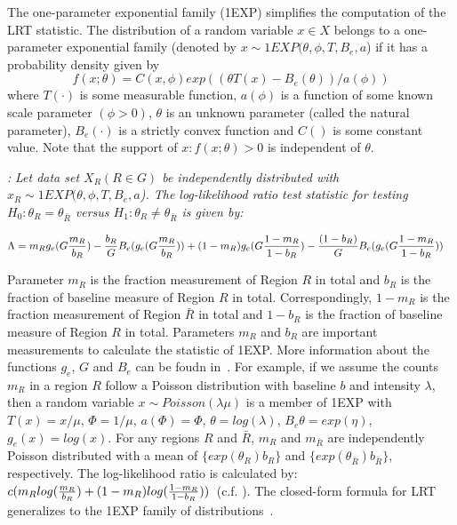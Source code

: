 \documentclass[AMA,LATO1COL]{WileyNJD-v2}
\begin{document}
The one-parameter exponential family (1EXP) simplifies the computation of the LRT statistic. The distribution of a random variable $x\in X$ belongs to a one-parameter exponential family \cite{DagMaxmize} (denoted by $x\sim 1EXP(\theta,\phi,T,B_e,a$) if it has a probability density given by
\begin{equation}
f(x; \theta )=C(x,\phi)exp((\theta T(x)-B_e(\theta))/a(\phi))
\label{oneexp}
\end{equation}
where  $T(\cdot)$ is some measurable function, $a(\phi)$ is a function of some known scale parameter $(\phi>0)$, $\theta$ is an unknown parameter (called the natural parameter), $B_e(\cdot)$ is a strictly convex function and $C()$ is some constant value. Note that the support of ${x:f(x;\theta)>0}$ is independent of $\theta$.
\begin{theorem}\label{thm1}
{\it\cite{DagMaxmize}:}
{\it Let data set $X_R (R\in G)$ be independently distributed with $x_R\sim 1EXP(\theta,\phi,T,B_e,a$). The log-likelihood ratio test statistic for testing $H_{0}: \theta_R = \theta_{\bar R}$ versus $H_{1}: \theta_R \neq \theta_{\bar R}$ is given by:}

\begin{eqnarray}
\Lambda&={m_R}g_e({G{m_R\over b_R}})-{b_R\over G} {B_e(g_e(G{m_R\over b_R}))} +(1-m_R)g_e({G{1-m_R\over {1-b_R}}})-{(1-b_R)\over G}{B_e(g_e({G{1-m_R\over {1-b_R}}}))}
\label{eq}
\end{eqnarray}
\label{thm1}
\end{theorem}
Parameter $m_R$ is the fraction measurement of Region $R$ in total and $b_R$ is the fraction of baseline measure of Region $R$ in total. Correspondingly, $1-m_R$ is the fraction measurement of Region $\bar R$ in total and $1-b_R$ is the fraction of baseline measure of Region $R$ in total. Parameters $m_R$  and $b_R$ are important measurements to calculate the statistic of 1EXP. More information about the functions $g_e$, $G$ and $B_e$ can be foudn in~\cite{DagMaxmize}.
For example, if we assume the counts $m_R$ in a region $R$ follow a Poisson distribution with baseline $b$ and intensity $\lambda$, then a random variable $x \sim Poisson(\lambda \mu)$ is a member of 1EXP with $T(x)=x/\mu$, $\Phi=1/\mu$, $a(\Phi)=\Phi$, $\theta=log(\lambda)$, $B_e{\theta}=exp(\eta)$, $g_e{(x)}=log(x)$. For any regions $R$ and $\bar R$, $m_R$ and $m_{\bar R}$ are independently Poisson distributed with a mean of $\{exp(\theta_R)b_R\}$ and $\{exp(\theta_{\bar R})b_{\bar R}\}$, respectively. The log-likelihood ratio is calculated by: $c(m_R log ({m_R\over {b_R}})+ (1-m_R)log({{1-m_R}\over {1-b_R} }))$~(c.f. \cite{DagMaxmize}). The closed-form formula for LRT generalizes to the 1EXP family of distributions~\cite{DagMaxmize}.
\end{document}
